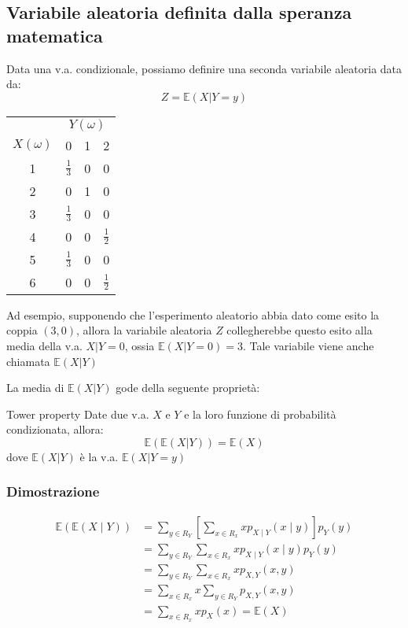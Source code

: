 \subsection{Variabile aleatoria definita dalla speranza matematica}
Data una v.a. condizionale, possiamo definire una seconda variabile aleatoria data da:
\[
	Z = \mathbb{E} \left(X | Y = y\right)
\]
\begin{minipage}[c]{0.38\textwidth}
	\begin{tabular}{|c|ccc|}
		\hline
		            & \multicolumn{3}{c|}{$Y(\omega)$}                       \\
		$X(\omega)$ & 0                                & 1 & 2               \\
		\hline 1    & $\frac{1}{3}$                    & 0 & 0               \\
		2           & 0                                & 1 & 0               \\
		3           & $\frac{1}{3}$                    & 0 & 0               \\
		4           & 0                                & 0 & $\frac{1}{2}$   \\
		5           & $\frac{1}{3}$                    & 0 & 0               \\
		6           & 0                                & 0 & $ \frac{1}{2} $ \\
		\hline
	\end{tabular}
\end{minipage}
%
\begin{minipage}[c]{0.60\textwidth}
	Ad esempio, supponendo che l'esperimento aleatorio abbia dato come esito la coppia $ \left(3,0\right) $, allora la variabile aleatoria $ Z $ collegherebbe questo esito alla media della v.a. $ X | Y = 0 $, ossia $ \mathbb{E} \left(X | Y = 0\right) = 3 $. Tale variabile viene anche chiamata $ \mathbb{E} \left(X | Y\right) $
\end{minipage}
\vskip3mm
La media di $ \mathbb{E} \left(X | Y\right) $ gode della seguente proprietà:
\begin{teorema}{Tower property}
	Date due v.a. $ X $ e $ Y $ e la loro funzione di probabilità condizionata, allora:
	\[
		\mathbb{E}\left(\mathbb{E}\left(X|Y\right)\right) = \mathbb{E}\left(X\right)
	\]
	dove $ \mathbb{E}\left(X|Y\right) $ è la v.a. $ \mathbb{E} \left(X | Y = y\right) $
\end{teorema}
\subsubsection*{Dimostrazione}
\begin{align*}
	\mathbb{E}(\mathbb{E}(X \mid Y)) & =\sum_{y \in R_Y}\left[\sum_{x \in R_x} x p_{X \mid Y}(x \mid y)\right] p_Y(y) \\
	                                 & =\sum_{y \in R_Y} \sum_{x \in R_x} x p_{X \mid Y}(x \mid y) p_Y(y)             \\ & =\sum_{y \in R_Y} \sum_{x \in R_x} x p_{X, Y}(x, y) \\ & =\sum_{x \in R_x} x \sum_{y \in R_Y} p_{X, Y}(x, y) \\ & =\sum_{x \in R_x} x p_X(x)=\mathbb{E}(X)
\end{align*}

